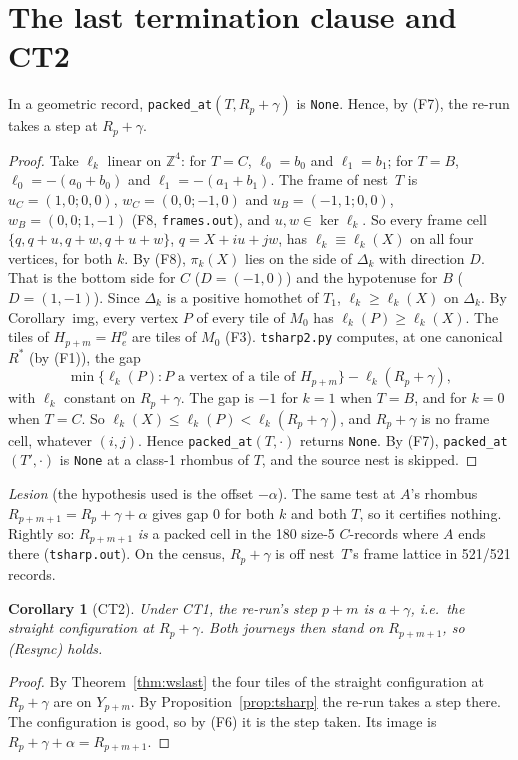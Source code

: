 \documentclass[11pt]{article}
\newtheorem{corollary}[theorem]{Corollary}
\theoremstyle{definition}\newtheorem{definition}[theorem]{Definition}\newtheorem{remark}[theorem]{Remark}
\newcommand{\Z}{\mathbb Z}
\begin{document}
\section{The last termination clause and CT2}\label{sec:tsharp}
\begin{proposition}\label{prop:tsharp}
In a geometric record, \texttt{packed\_at}$(T,R_p+\gamma)$ is \texttt{None}. Hence, by (F7), the re-run takes a step at $R_p+\gamma$.
\end{proposition}
\begin{proof}
Take $\ell_k$ linear on $\Z^4$: for $T=C$, $\ell_0=b_0$ and $\ell_1=b_1$; for $T=B$, $\ell_0=-(a_0+b_0)$ and $\ell_1=-(a_1+b_1)$. The frame of nest~$T$ is $u_C=(1,0;0,0)$, $w_C=(0,0;-1,0)$ and $u_B=(-1,1;0,0)$, $w_B=(0,0;1,-1)$ (F8, \texttt{frames.out}), and $u,w\in\ker\ell_k$. So every frame cell $\{q,q+u,q+w,q+u+w\}$, $q=X+iu+jw$, has $\ell_k\equiv\ell_k(X)$ on all four vertices, for both $k$.
By (F8), $\pi_k(X)$ lies on the side of $\Delta_k$ with direction $D$. That is the bottom side for $C$ ($D=(-1,0)$) and the hypotenuse for $B$ ($D=(1,-1)$). Since $\Delta_k$ is a positive homothet of $T_1$, $\ell_k\ge\ell_k(X)$ on $\Delta_k$. By Corollary~img, every vertex $P$ of every tile of $M_0$ has $\ell_k(P)\ge\ell_k(X)$.
The tiles of $H_{p+m}=H^o_e$ are tiles of $M_0$ (F3). \texttt{tsharp2.py} computes, at one canonical $R^\ast$ (by (F1)), the gap
\[\min\{\ell_k(P):P \text{ a vertex of a tile of } H_{p+m}\}-\ell_k(R_p+\gamma),\]
with $\ell_k$ constant on $R_p+\gamma$. The gap is $-1$ for $k=1$ when $T=B$, and for $k=0$ when $T=C$. So $\ell_k(X)\le\ell_k(P)<\ell_k(R_p+\gamma)$, and $R_p+\gamma$ is no frame cell, whatever $(i,j)$. Hence \texttt{packed\_at}$(T,\cdot)$ returns \texttt{None}. By (F7), \texttt{packed\_at}$(T',\cdot)$ is \texttt{None} at a class-1 rhombus of $T$, and the source nest is skipped.
\end{proof}
\noindent\emph{Lesion} (the hypothesis used is the offset $-\alpha$). The same test at $A$'s rhombus $R_{p+m+1}=R_p+\gamma+\alpha$ gives gap $0$ for both $k$ and both $T$, so it certifies nothing. Rightly so: $R_{p+m+1}$ \emph{is} a packed cell in the 180 size-5 $C$-records where $A$ ends there (\texttt{tsharp.out}). On the census, $R_p+\gamma$ is off nest~$T$'s frame lattice in 521/521 records.

\begin{corollary}[CT2]\label{cor:ct2}
Under CT1, the re-run's step $p+m$ is $a+\gamma$, i.e.\ the straight configuration at $R_p+\gamma$. Both journeys then stand on $R_{p+m+1}$, so (Resync) holds.
\end{corollary}
\begin{proof}
By Theorem~\ref{thm:wslast} the four tiles of the straight configuration at $R_p+\gamma$ are on $Y_{p+m}$. By Proposition~\ref{prop:tsharp} the re-run takes a step there. The configuration is good, so by (F6) it is the step taken. Its image is $R_p+\gamma+\alpha=R_{p+m+1}$.
\end{proof}
\end{document}

